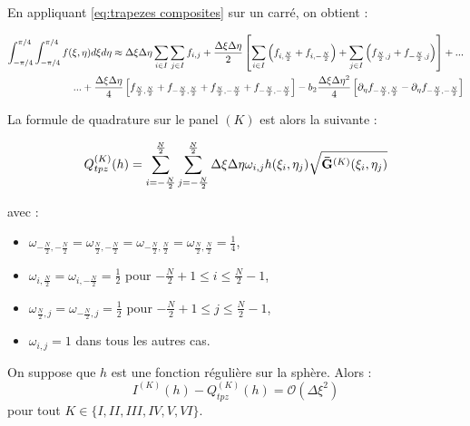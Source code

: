 En appliquant \eqref{eq:trapezes composites} sur un carré, on obtient :

\begin{equation}
\begin{split}
\displaystyle\int_{-\pi/4}^{\pi/4} \displaystyle\int_{-\pi/4}^{\pi/4} f(\xi,\eta)d\xi d\eta \approx \Delta \xi \Delta \eta \displaystyle\sum\limits_{i \in I} \displaystyle\sum\limits_{j \in I} f_{i,j} +  \dfrac{\Delta \xi \Delta \eta}{2} \left[ \displaystyle\sum\limits_{i \in I} \left(  f_{i,\frac{N}{2}} + f_{i,-\frac{N}{2}}  \right) + \displaystyle\sum\limits_{j \in I} \left(  f_{\frac{N}{2},j} + f_{-\frac{N}{2},j}  \right) \right] + ... \\
...+ \dfrac{\Delta \xi \Delta \eta}{4} \left[ f_{\frac{N}{2},\frac{N}{2}}+f_{-\frac{N}{2},\frac{N}{2}}+f_{\frac{N}{2},-\frac{N}{2}}+f_{-\frac{N}{2},-\frac{N}{2}} \right]- b_2 \dfrac{\Delta \xi \Delta \eta^2}{4} \left[ \partial_{\eta} f_{-\frac{N}{2},\frac{N}{2}} - \partial_{\eta} f_{-\frac{N}{2},-\frac{N}{2}} \right]
\end{split}
\label{eq:trapezes 2d composite}
\end{equation}

La formule de quadrature sur le panel $(K)$ est alors la suivante :

\begin{equation}
Q_{tpz}^{(K)}(h)=\displaystyle\sum\limits_{i = -\frac{N}{2}}^{\frac{N}{2}}\displaystyle\sum\limits_{j = -\frac{N}{2}}^{\frac{N}{2}} \Delta \xi \Delta \eta \omega_{i,j} h(\xi_i, \eta_j) \sqrt{\mathbf{\bar{G}}^{(K)}(\xi_i, \eta_j)}
\label{eq:trapezes par panel}
\end{equation}

avec :

\begin{itemize}
\item $\omega_{-\frac{N}{2},-\frac{N}{2}}=\omega_{\frac{N}{2},-\frac{N}{2}}=\omega_{-\frac{N}{2},\frac{N}{2}}=\omega_{\frac{N}{2},\frac{N}{2}}=\frac{1}{4}$,
\item $\omega_{i,\frac{N}{2}}=\omega_{i,-\frac{N}{2}}=\frac{1}{2}$ pour $-\frac{N}{2}+1 \leq i \leq \frac{N}{2}-1$,
\item $\omega_{\frac{N}{2},j}=\omega_{-\frac{N}{2},j}=\frac{1}{2}$ pour $-\frac{N}{2}+1 \leq j \leq \frac{N}{2}-1$,
\item $\omega_{i,j}=1$ dans tous les autres cas.
\end{itemize}

\begin{proposition}
On suppose que $h$ est une fonction régulière sur la sphère. Alors :
\begin{equation}
I^{(K)}(h) - Q_{tpz}^{(K)}(h) = \mathcal{O} \left( \Delta \xi^2 \right)
\end{equation}
pour tout $K \in \lbrace I, II, III, IV, V, VI \rbrace$.
\label{prop:consistance tpz panel}
\end{proposition}

